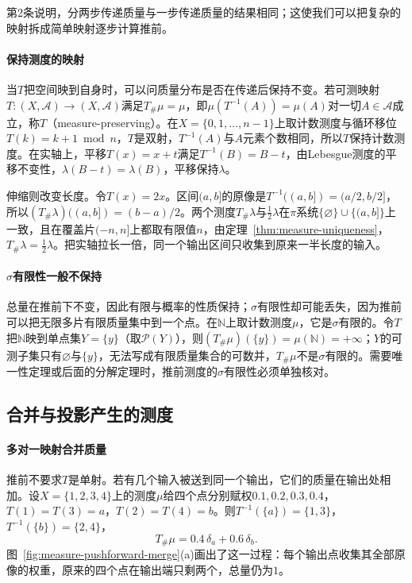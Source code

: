 第2条说明，分两步传递质量与一步传递质量的结果相同；这使我们可以把复杂的映射拆成简单映射逐步计算推前。

\paragraph{保持测度的映射}
当$T$把空间映到自身时，可以问质量分布是否在传递后保持不变。若可测映射$T:(X,\mathcal A)\to(X,\mathcal A)$满足$T_\#\mu=\mu$，即$\mu(T^{-1}(A))=\mu(A)$对一切$A\in\mathcal A$成立，称$T$（measure-preserving）。在$X=\{0,1,\dots,n-1\}$上取计数测度与循环移位$T(k)=k+1\bmod n$，$T$是双射，$T^{-1}(A)$与$A$元素个数相同，所以$T$保持计数测度。在实轴上，平移$T(x)=x+t$满足$T^{-1}(B)=B-t$，由Lebesgue测度的平移不变性，$\lambda(B-t)=\lambda(B)$，平移保持$\lambda$。

伸缩则改变长度。令$T(x)=2x$。区间$(a,b]$的原像是$T^{-1}((a,b])=(a/2,b/2]$，所以$(T_\#\lambda)((a,b])=(b-a)/2$。两个测度$T_\#\lambda$与$\tfrac12\lambda$在$\pi$系统$\{\varnothing\}\cup\{(a,b]\}$上一致，且在覆盖片$(-n,n]$上都取有限值$n$，由定理~\ref{thm:measure-uniqueness}，$T_\#\lambda=\tfrac12\lambda$。把实轴拉长一倍，同一个输出区间只收集到原来一半长度的输入。

\paragraph{$\sigma$有限性一般不保持}
总量在推前下不变，因此有限与概率的性质保持；$\sigma$有限性却可能丢失，因为推前可以把无限多片有限质量集中到一个点。在$\mathbb N$上取计数测度$\mu$，它是$\sigma$有限的。令$T$把$\mathbb N$映到单点集$Y=\{y\}$（取$\mathcal P(Y)$），则$(T_\#\mu)(\{y\})=\mu(\mathbb N)=+\infty$；$Y$的可测子集只有$\varnothing$与$\{y\}$，无法写成有限质量集合的可数并，$T_\#\mu$不是$\sigma$有限的。需要唯一性定理或后面的分解定理时，推前测度的$\sigma$有限性必须单独核对。

\subsection{合并与投影产生的测度}
\label{sec:measure-merge-projection}

\paragraph{多对一映射合并质量}
推前不要求$T$是单射。若有几个输入被送到同一个输出，它们的质量在输出处相加。设$X=\{1,2,3,4\}$上的测度$\mu$给四个点分别赋权$0.1,0.2,0.3,0.4$，$T(1)=T(3)=a$，$T(2)=T(4)=b$。则$T^{-1}(\{a\})=\{1,3\}$，$T^{-1}(\{b\})=\{2,4\}$，
\[
 T_\#\mu=0.4\,\delta_a+0.6\,\delta_b.
\]
图~\ref{fig:measure-pushforward-merge}(a)画出了这一过程：每个输出点收集其全部原像的权重，原来的四个点在输出端只剩两个，总量仍为$1$。

